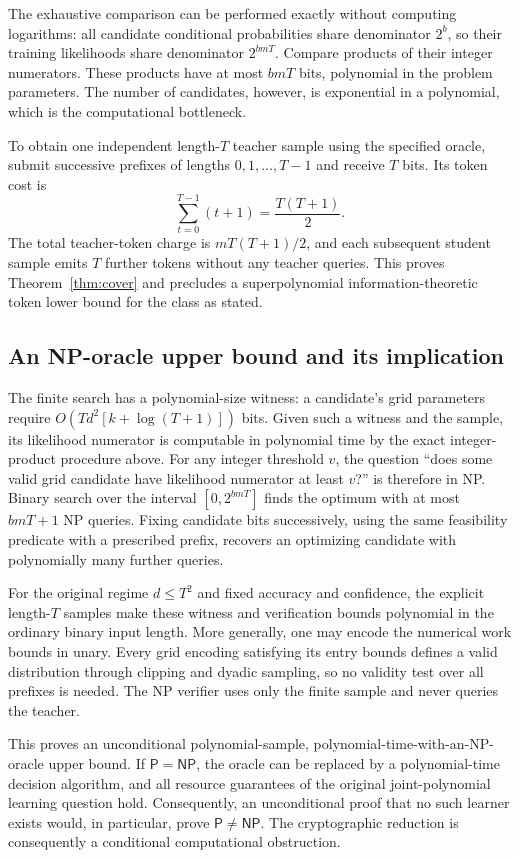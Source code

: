\documentclass[11pt]{article}
\theoremstyle{definition}
\theoremstyle{remark}
\begin{document}
The exhaustive comparison can be performed exactly without computing logarithms: all candidate conditional probabilities share denominator $2^b$, so their training likelihoods share denominator $2^{bmT}$. Compare products of their integer numerators. These products have at most $bmT$ bits, polynomial in the problem parameters. The number of candidates, however, is exponential in a polynomial, which is the computational bottleneck.

To obtain one independent length-$T$ teacher sample using the specified oracle, submit successive prefixes of lengths $0,1,\ldots,T-1$ and receive $T$ bits. Its token cost is
\[
\sum_{t=0}^{T-1}(t+1)=\frac{T(T+1)}2.
\]
The total teacher-token charge is $mT(T+1)/2$, and each subsequent student sample emits $T$ further tokens without any teacher queries. This proves Theorem~\ref{thm:cover} and precludes a superpolynomial information-theoretic token lower bound for the class as stated.

\subsection{An NP-oracle upper bound and its implication}

The finite search has a polynomial-size witness: a candidate's grid parameters require
$O(Td^2[k+\log(T+1)])$ bits. Given such a witness and the sample, its likelihood numerator is computable in polynomial time by the exact integer-product procedure above. For any integer threshold $v$, the question ``does some valid grid candidate have likelihood numerator at least $v$?'' is therefore in NP. Binary search over the interval $[0,2^{bmT}]$ finds the optimum with at most $bmT+1$ NP queries. Fixing candidate bits successively, using the same feasibility predicate with a prescribed prefix, recovers an optimizing candidate with polynomially many further queries.

For the original regime $d\le T^2$ and fixed accuracy and confidence, the explicit length-$T$ samples make these witness and verification bounds polynomial in the ordinary binary input length. More generally, one may encode the numerical work bounds in unary. Every grid encoding satisfying its entry bounds defines a valid distribution through clipping and dyadic sampling, so no validity test over all prefixes is needed. The NP verifier uses only the finite sample and never queries the teacher.

This proves an unconditional polynomial-sample, polynomial-time-with-an-NP-oracle upper bound. If $\mathsf P=\mathsf{NP}$, the oracle can be replaced by a polynomial-time decision algorithm, and all resource guarantees of the original joint-polynomial learning question hold. Consequently, an unconditional proof that no such learner exists would, in particular, prove $\mathsf P\ne\mathsf{NP}$. The cryptographic reduction is consequently a conditional computational obstruction.
\end{document}
